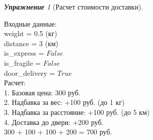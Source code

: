 \documentclass[a4,12pt]{article}
\theoremstyle{remark}
\newtheorem{exercise}{\textbf{Упражнение}}[section]
\begin{document}
\begin{exercise}[Расчет стоимости доставки]
        \begin{outputformat}[title=Пример 1]
            Входные данные: \\
            weight = 0.5 (кг) \\
            distance = 3 (км) \\
            is\_express = $False$ \\
            is\_fragile = $False$ \\
            door\_delivery = $True$ \\

            Расчет: \\
            1. Базовая цена: 300 руб. \\
            2. Надбавка за вес: +100 руб. (до 1 кг) \\
            3. Надбавка за расстояние: +100 руб. (до 5 км) \\
            4. Доставка до двери: +200 руб. \\

            300 + 100 + 100 + 200 = 700 руб. 
        \end{outputformat}

    \end{exercise}
\end{document}
